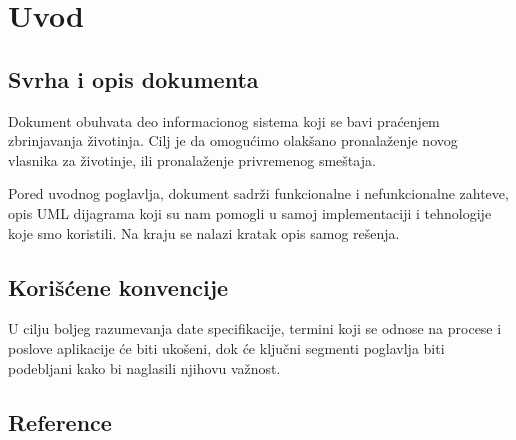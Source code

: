 \section{Uvod}
\subsection{Svrha i opis dokumenta}
\par Dokument obuhvata deo informacionog sistema koji se bavi praćenjem zbrinjavanja životinja. Cilj je da omogućimo olakšano pronalaženje novog vlasnika za životinje, ili
pronalaženje privremenog smeštaja.
\par Pored uvodnog poglavlja, dokument sadrži funkcionalne i nefunkcionalne zahteve, opis UML dijagrama koji su nam pomogli u samoj implementaciji i tehnologije koje smo 
koristili. Na kraju se nalazi kratak opis samog rešenja.
\subsection{Korišćene konvencije}
\par U cilju boljeg razumevanja date specifikacije, termini koji se odnose na procese i poslove aplikacije će biti ukošeni, dok će ključni segmenti poglavlja
biti podebljani kako bi naglasili njihovu važnost.
\subsection{Reference}
